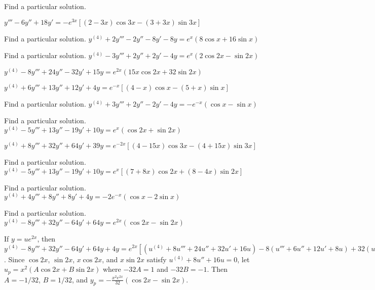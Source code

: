\documentclass{ximera}
\begin{document}
\begin{problem}\label{exer:9.3.36}   Find a particular solution. 

$y'''-6y''+18y'=-e^{3x}[(2-3x)\cos
3x-(3+3x)\sin3x]$
\end{problem}

\begin{problem}\label{exer:9.3.37}   Find a particular solution.   $y^{(4)}+2y'''-2y''-8y'-8y=e^x(8\cos
x+16\sin x)$
\end{problem}

\begin{problem}\label{exer:9.3.38}   Find a particular solution.   $y^{(4)}-3y'''+2y''+2y'-4y=e^x(2\cos2x
-\sin2x)$
\end{problem}

\begin{problem}\label{exer:9.3.39}
$y^{(4)}-8y'''+24y''-32y'+15y=e^{2x}(15x\cos2x+32\sin2x)$
\end{problem}

\begin{problem}\label{exer:9.3.40}
$y^{(4)}+6y'''+13y''+12y'+4y=e^{-x}[(4-x)\cos x-(5+x)\sin x]$
\end{problem}

\begin{problem}\label{exer:9.3.41}   Find a particular solution.   $y^{(4)}+3y'''+2y''-2y'-4y=-e^{-x}
(\cos x-\sin x)$
\end{problem}

\begin{problem}\label{exer:9.3.42}   Find a particular solution.   $y^{(4)}-5y'''+13y''-19y'+10y=e^x
(\cos2x+\sin2x)$
\end{problem}

\begin{problem}\label{exer:9.3.43}
$y^{(4)}+8y'''+32y''+64y'+39y=e^{-2x}[(4-15x)\cos3x-(4+15x)\sin
3x]$
\end{problem}

\begin{problem}\label{exer:9.3.44}   Find a particular solution.   $y^{(4)}-5y'''+13y''-19y'+10y=e^x[(7+8x)\cos
2x+(8-4x)\sin2x]$
\end{problem}

\begin{problem}\label{exer:9.3.45}   Find a particular solution.   $y^{(4)}+4y'''+8y''+8y'+4y=-2e^{-x}
(\cos x-2\sin x)$
\end{problem}

\begin{problem}\label{exer:9.3.46}   Find a particular solution.   $y^{(4)}-8y'''+32y''-64y'+64y=e^{2x}
(\cos2x-\sin2x)$

\begin{solution}
If $y=ue^{2x}$, then
$y^{(4)}-8y'''+32y''-64y'+64y+4y=e^{2x}[
(u^{(4)}+8u'''+24u''+32u'+16u) -8(u'''+6u''+12u'+8u) +32(u''+4u'+4u)
-64(u'+2u) +64u]=e^{2x}(u^{(4)}+8u''+16u)$. Since $\cos2x$,  $\sin2x$, $x\cos2x$,
and $x\sin2x$ satisfy $u^{(4)}+8u''+16u=0$,
let $u_p=x^2(A\cos2x+B\sin2x)$ where $-32A=1$ and $-32B=-1$. Then
$A=-1/32$, $B=1/32$, and
 $y_p=-\frac{x^2e^{2x}}{32}(\cos2x-\sin2x)$.
\end{solution}
\end{problem}
\end{document}
